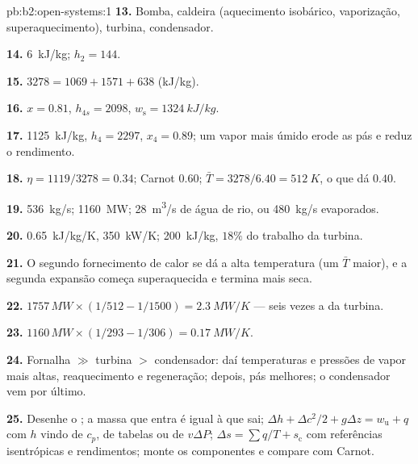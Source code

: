 \begin{solution}{pb:b2:open-systems:1}
\textbf{13.} Bomba, caldeira (aquecimento isobárico, vaporização, superaquecimento),
turbina, condensador.

\textbf{14.} \qty{6}{kJ/kg}; $h_2 = 144$.

\textbf{15.} $3278 = 1069 + 1571 + 638$ (\unit{kJ/kg}).

\textbf{16.} $x = 0.81$, $h_{4s} = 2098$, $w_{\text{s}} = \qty{1324}{kJ/kg}$.

\textbf{17.} \qty{1125}{kJ/kg}, $h_4 = 2297$, $x_4 = 0.89$; um vapor mais úmido erode as
pás e reduz o rendimento.

\textbf{18.} $\eta = 1119/3278 = 0.34$; Carnot $0.60$; $\bar T = 3278/6.40 =
\qty{512}{K}$, o que dá $0.40$.

\textbf{19.} \qty{536}{kg/s}; \qty{1160}{MW}; \qty{28}{m^3/s} de água de rio,
ou \qty{480}{kg/s} evaporados.

\textbf{20.} \qty{0.65}{kJ/kg/K}, \qty{350}{kW/K}; \qty{200}{kJ/kg}, $18\%$ do
trabalho da turbina.

\textbf{21.} O segundo fornecimento de calor se dá a alta temperatura (um $\bar T$
maior), e a segunda expansão começa superaquecida e termina mais seca.

\textbf{22.} $1757\,\unit{MW} \times (1/512 - 1/1500) = \qty{2.3}{MW/K}$ --- seis vezes
a da turbina.

\textbf{23.} $1160\,\unit{MW} \times (1/293 - 1/306) = \qty{0.17}{MW/K}$.

\textbf{24.} Fornalha $\gg$ turbina $>$ condensador: daí temperaturas e pressões
de vapor mais altas, reaquecimento e regeneração; depois, pás melhores;
o condensador vem por último.

\textbf{25.} Desenhe o ; a massa que entra é igual à que sai; $\Delta h +
\Delta c^2/2 + g\Delta z = w_{\text{u}} + q$ com $h$ vindo de $c_p$, de tabelas ou
de $v\Delta P$; $\Delta s = \sum q/T + s_{\text{c}}$ com referências isentrópicas e
rendimentos; monte os componentes e compare com Carnot.
\end{solution}
